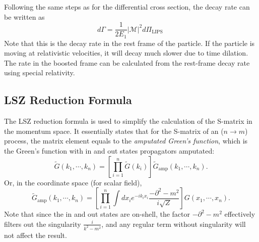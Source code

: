 \documentclass[aps,prb,superscriptaddress,nofootinbib]{revtex4}
\begin{document}
Following the same steps as for the differential cross section, the decay rate can be written as
\begin{equation}
	d \Gamma=\frac{1}{2 E_{1}}|\mathcal{M}|^{2} d \Pi_{\text {LIPS }}
\end{equation}
Note that this is the decay rate in the rest frame of the particle. 
If the particle is moving at relativistic velocities, it will decay much slower due to time dilation. 
The rate in the boosted frame can be calculated from the rest-frame decay rate using special relativity.





\subsection{LSZ Reduction Formula}

The LSZ reduction formula is used to simplify the calculation of the S-matrix in the momentum space.
It essentially states that for the S-matrix of an ($n \rightarrow m$) process, the matrix element equals to the \textit{amputated Green's function}, which is the Green's function with in and out states propagators amputated:
\begin{equation}
	\tilde{G}(k_1,\cdots,k_n) = \left[\prod_{i=1}^n \tilde{G}(k_i) \right] \tilde{G}_{\mathrm{amp}}(k_1,\cdots,k_n).
\end{equation}
Or, in the coordinate space (for scalar field), 
\begin{equation}
	\tilde{G}_{\mathrm{amp}}(k_1,\cdots,k_n) = \left[\prod_{i=1}^n \int d x_i e^{-i k_i x_i} \frac{-\partial^2-m^2}{i\sqrt Z} \right] G(x_1,\cdots,x_n).
\end{equation}
Note that since the in and out states are on-shell, the factor $-\partial^2-m^2$ effectively filters out the singularity $\frac{i}{k^2-m^2}$, and any regular term without singularity will not affect the result.
\end{document}

